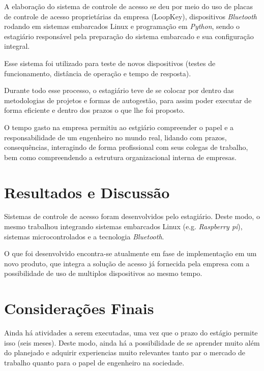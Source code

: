 \documentclass[12pt,fleqn]{article}
\begin{document}
A elaboração do sistema de controle de acesso se deu por meio do uso de placas de controle de acesso proprietárias da empresa (LoopKey),
dispositivos \textit{Bluetooth} rodando em  sistemas embarcados Linux e programação em \textit{Python}, sendo o estagiário
responsável pela preparação do sistema embarcado e sua configuração integral. 

Esse sistema foi utilizado para teste de novos dispositivos (testes de funcionamento, distância de operação e tempo 
de resposta).

Durante todo esse processo, o estagiário teve de se colocar por dentro das metodologias de projetos e formas de autogestão,
para assim poder executar de forma eficiente e dentro dos prazos o que lhe foi proposto.

O tempo gasto na empresa permitiu ao estgiário compreender o papel e a responsabilidade de um engenheiro no mundo real, lidando
com prazos, consequências, interagindo de forma profissional com seus colegas de trabalho,
bem como compreendendo a estrutura organizacional interna de empresas.

\newpage
\section{Resultados e Discussão}

 \hspace*{1.25cm} Sistemas de controle de acesso foram desenvolvidos pelo estagiário. 
 Deste modo, o mesmo trabalhou integrando sistemas embarcados Linux (e.g. \textit{Raspberry pi}), 
 sistemas microcontrolados e a tecnologia \textit{Bluetooth}. 

 O que foi desenvolvido encontra-se atualmente em fase de implementação em um novo produto, que integra a solução 
 de acesso já fornecida pela empresa com a possibilidade de uso de multiplos dispositivos ao mesmo tempo. 

\section{Considerações Finais}
\hspace*{1.25cm} Ainda há atividades a serem executadas, uma vez que o prazo do estágio 
permite isso (seis meses). Deste modo, ainda há a possibilidade de se aprender muito além do planejado e adquirir experiencias
muito relevantes tanto par o mercado de trabalho quanto para o papel de engenheiro na sociedade.


%

\end{document}
